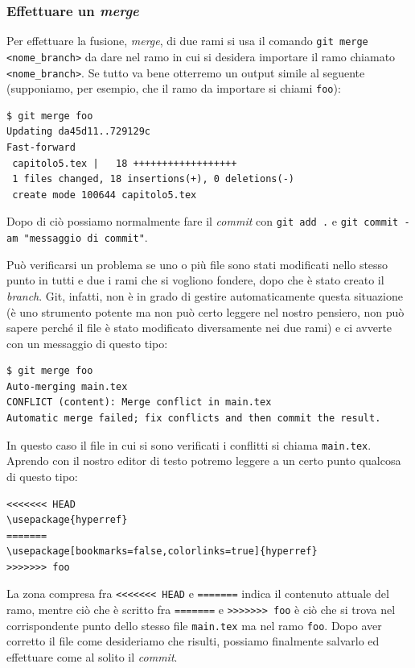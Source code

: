 \documentclass[a4paper,12pt,oneside]{article}
\begin{document}
\subsubsection{Effettuare un \emph{merge}}
Per effettuare la fusione, \emph{merge}, di due rami si usa il comando
\lstinline|git merge <nome_branch>| da dare nel ramo in cui si desidera importare
il ramo chiamato \lstinline|<nome_branch>|. Se tutto va bene otterremo un output
simile al seguente (supponiamo, per esempio, che il ramo da importare si chiami
\lstinline|foo|):
\begin{lstlisting}
$ git merge foo 
Updating da45d11..729129c
Fast-forward
 capitolo5.tex |   18 ++++++++++++++++++
 1 files changed, 18 insertions(+), 0 deletions(-)
 create mode 100644 capitolo5.tex
\end{lstlisting}
Dopo di ciò possiamo normalmente fare il \emph{commit} con
\lstinline|git add .| e \lstinline|git commit -am "messaggio di commit"|.

Può verificarsi un problema se uno o più file sono stati modificati nello stesso
punto in tutti e due i rami che si vogliono fondere, dopo che è stato creato il
\emph{branch}. Git, infatti, non è in grado di gestire automaticamente questa
situazione (è uno strumento potente ma non può certo leggere nel nostro pensiero,
non può sapere perché il file è stato modificato diversamente nei due rami) e ci
avverte con un messaggio di questo tipo:
\begin{lstlisting}[language={}]
$ git merge foo 
Auto-merging main.tex
CONFLICT (content): Merge conflict in main.tex
Automatic merge failed; fix conflicts and then commit the result.
\end{lstlisting}
In questo caso il file in cui si sono verificati i conflitti si chiama
\lstinline|main.tex|. Aprendo con il nostro editor di testo potremo leggere
a un certo punto qualcosa di questo tipo:
\begin{lstlisting}[language={},emph={HEAD,foo}]
<<<<<<< HEAD
\usepackage{hyperref}
=======
\usepackage[bookmarks=false,colorlinks=true]{hyperref}
>>>>>>> foo
\end{lstlisting}
La zona compresa fra \lstinline|<<<<<<< HEAD| e \lstinline|=======| indica il
contenuto attuale del ramo, mentre ciò che è scritto fra \lstinline|=======| e
\lstinline|>>>>>>> foo| è ciò che si trova nel corrispondente punto dello stesso
file \lstinline|main.tex| ma nel ramo \lstinline|foo|. Dopo aver corretto il file
come desideriamo che risulti, possiamo finalmente salvarlo ed effettuare come al
solito il \emph{commit}.
\end{document}
